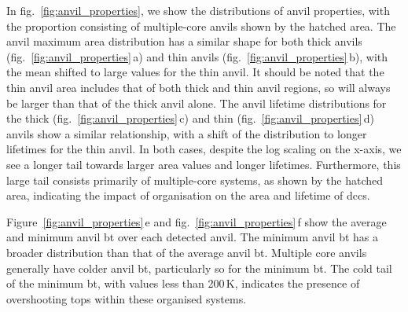 In fig.~\ref{fig:anvil_properties}, we show the distributions of anvil properties, with the proportion consisting of multiple-core anvils shown by the hatched area.
The anvil maximum area distribution has a similar shape for both thick anvils (fig.~\ref{fig:anvil_properties}\,a) and thin anvils (fig.~\ref{fig:anvil_properties}\,b), with the mean shifted to large values for the thin anvil.
It should be noted that the thin anvil area includes that of both thick and thin anvil regions, so will always be larger than that of the thick anvil alone.
The anvil lifetime distributions for the thick (fig.~\ref{fig:anvil_properties}\,c) and thin (fig.~\ref{fig:anvil_properties}\,d) anvils show a similar relationship, with a shift of the distribution to longer lifetimes for the thin anvil.
In both cases, despite the log scaling on the x-axis, we see a longer tail towards larger area values and longer lifetimes.
Furthermore, this large tail consists primarily of multiple-core systems, as shown by the hatched area, indicating the impact of organisation on the area and lifetime of \acrshort{dcc}s.

Figure~\ref{fig:anvil_properties}\,e and fig.~\ref{fig:anvil_properties}\,f show the average and minimum anvil \acrshort{bt} over each detected anvil.
The minimum anvil \acrshort{bt} has a broader distribution than that of the average anvil \acrshort{bt}.
Multiple core anvils generally have colder anvil \acrshort{bt}, particularly so for the minimum \acrshort{bt}.
The cold tail of the minimum \acrshort{bt}, with values less than 200\,\unit{K}, indicates the presence of overshooting tops within these organised systems.

